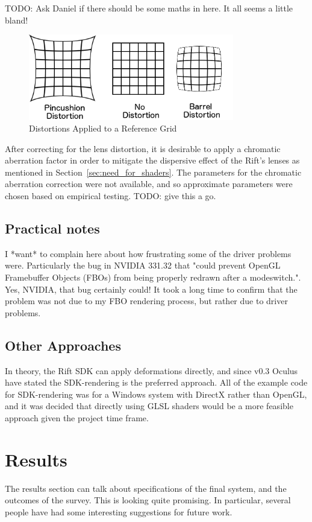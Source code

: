 \documentclass[MSc,paper=a4,pagesize=auto]{icldt}
\begin{document}
TODO: Ask Daniel if there should be some maths in here. It all seems a little bland!

\begin{figure}[htbp!]
    \centering
    \includegraphics[width=0.8\textwidth]{resources/distortions}
    \caption{Distortions Applied to a Reference Grid}
    \label{fig:distortions}
\end{figure}

After correcting for the lens distortion, it is desirable to apply a chromatic aberration factor in order to mitigate the dispersive effect of the Rift's lenses as mentioned in Section~\ref{sec:need_for_shaders}. The parameters for the chromatic aberration correction were not available, and so approximate parameters were chosen based on empirical testing. TODO: give this a go. 

\section{Practical notes}
I *want* to complain here about how frustrating some of the driver problems were. Particularly the bug in NVIDIA 331.32 that "could prevent OpenGL Framebuffer Objects (FBOs) from being properly redrawn after a modeswitch.". Yes, NVIDIA, that bug certainly could! It took a long time to confirm that the problem was not due to my FBO rendering process, but rather due to driver problems.


\section{Other Approaches}
In theory, the Rift SDK can apply deformations directly, and since v0.3 Oculus have stated the SDK-rendering is the preferred approach. All of the example code for SDK-rendering was for a Windows system with DirectX rather than OpenGL, and it was decided that directly using GLSL shaders would be a more feasible approach given the project time frame. 

\chapter{Results}
The results section can talk about specifications of the final system, and the outcomes of the survey. This is looking quite promising. In particular, several people have had some interesting suggestions for future work. 
\end{document}
